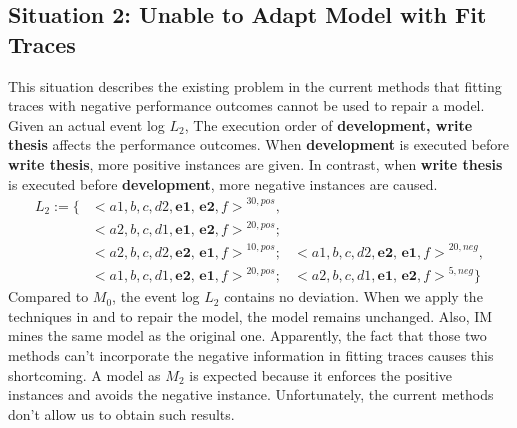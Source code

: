 \subsection{Situation 2: \small{Unable to Adapt Model with Fit Traces}}
This situation describes the existing problem in the current methods that fitting traces with negative performance outcomes cannot be used to repair a model. Given an actual event log $L_2$, The execution order of \textbf{development, write thesis} affects the performance outcomes. When \textbf{development} is executed before \textbf{write thesis}, more positive instances are given. In contrast, when \textbf{write thesis} is executed before \textbf{development}, more negative instances are caused. 
\begin{align*}
L_2:=\{ & { < a1, b, c, d2, \textbf{e1, e2}, f>}^{30, pos} , \\   
&{< a2, b, c, d1, \textbf{e1, e2}, f>}^{20, pos};   \\
&{< a2, b, c, d2, \textbf{e2, e1}, f>}^{10, pos}; 
& {< a1, b, c, d2, \textbf{e2, e1}, f>}^{20, neg} , \\
&{< a1, b, c, d1, \textbf{e2, e1}, f>}^{20, pos}; 
& {<a2, b, c, d1, \textbf{e1, e2}, f>}^{5, neg}  \}
\end{align*}
Compared to $M_0$, the event log $L_2$ contains no deviation. When we apply the techniques in  \cite{fahland2015model} and  \cite{dees2017enhancing} to repair the model, the model remains unchanged. Also, IM mines the same model as the original one. Apparently, the fact that those two methods can't incorporate the negative information in fitting traces causes this shortcoming. A model as $M_2$ is expected because it enforces the positive instances and avoids the negative instance. Unfortunately, the current methods don't allow us to obtain such results. 
